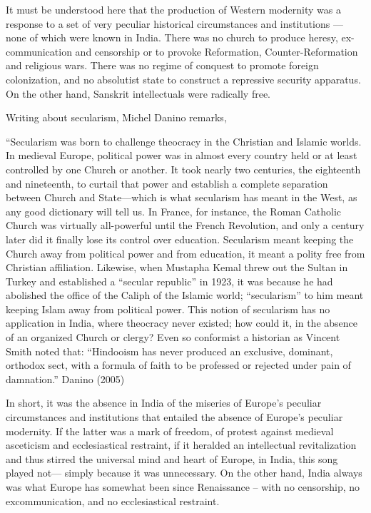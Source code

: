 It must be understood here that the production of Western modernity was a response to a set of very peculiar historical circumstances and institutions — none of which were known in India. There was no church to produce heresy, ex-communication and censorship or to provoke Reformation, Counter-Reformation and religious wars. There was no regime of conquest to promote foreign colonization, and no absolutist state to construct a repressive security apparatus. On the other hand, Sanskrit intellectuals were {\rm radically free}. 

Writing about secularism, Michel Danino remarks,
\begin{myquote}
“Secularism was born to challenge theocracy in the Christian and Islamic worlds. In medieval Europe, political power was in almost every country held or at least controlled by one Church or another. It took nearly two centuries, the eighteenth and nineteenth, to curtail that power and establish a complete separation between Church and State—which is what secularism has meant in the West, as any good dictionary will tell us. In France, for instance, the Roman Catholic Church was virtually all-powerful until the French Revolution, and only a century later did it finally lose its control over education. Secularism meant keeping the Church away from political power and from education, it meant a polity free from Christian affiliation. Likewise, when Mustapha Kemal threw out the Sultan in Turkey and established a “secular republic” in 1923, it was because he had abolished the office of the Caliph of the Islamic world; “secularism” to him meant keeping Islam away from political power.  This notion of secularism has no application in India, where theocracy never existed; how could it, in the absence of an organized Church or clergy? Even so conformist a historian as Vincent Smith noted that: “Hindooism has never produced an exclusive, dominant, orthodox sect, with a formula of faith to be professed or rejected under pain of damnation.”	\hfill{Danino (2005)}
\end{myquote}

In short, it was the absence in India of the miseries of Europe’s peculiar circumstances and institutions that entailed the absence of Europe’s peculiar modernity. If the latter was a mark of freedom, of protest against medieval asceticism and ecclesiastical restraint, if it heralded an intellectual revitalization and thus stirred the universal mind and heart of Europe, in India, this song played not— simply because it was unnecessary. On the other hand, India always was what Europe has somewhat been since Renaissance – with no censorship, no excommunication, and no ecclesiastical restraint.

